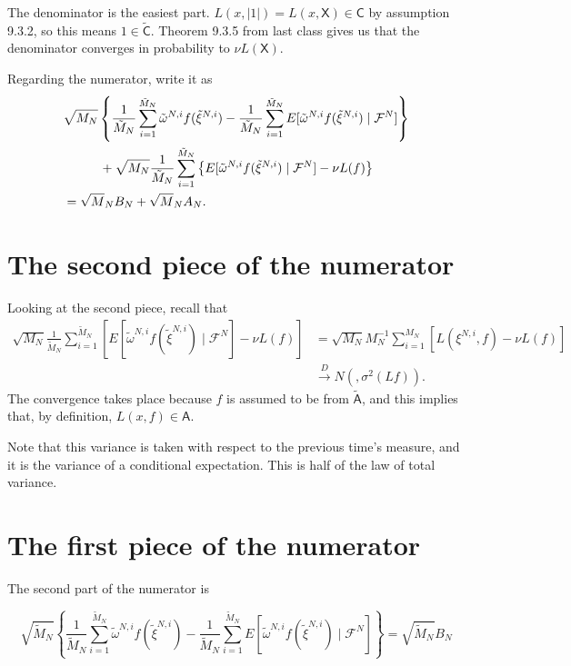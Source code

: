 \documentclass{article}
\begin{document}
The denominator is the easiest part. $L(x, |1|) = L(x,\mathsf{X}) \in \mathsf{C}$ by assumption 9.3.2, so this means $1 \in \tilde{\mathsf{C}}$. Theorem 9.3.5 from last class gives us that the denominator converges in probability to $\nu L(\mathsf{X})$.

Regarding the numerator, write it as 
\begin{align*}
&\sqrt{M_N}\left\{  \frac{1}{\tilde{M}_N} \sum_{i=1}^{\tilde{M}_N} \tilde{\omega}^{N,i} f(\tilde{\xi}^{N,i}) -  \frac{1}{\tilde{M}_N} \sum_{i=1}^{\tilde{M}_N} E[ \tilde{\omega}^{N,i} f(\tilde{\xi}^{N,i}) \mid \mathcal{F}^N] \right\} \\
& \hspace{10mm} + \sqrt{M_N} \frac{1}{\tilde{M}_N} \sum_{i=1}^{\tilde{M}_N} \left\{ E[ \tilde{\omega}^{N,i} f(\tilde{\xi}^{N,i}) \mid \mathcal{F}^N] - \nu L(f) \right\}\\
&= \sqrt{M}_N B_N + \sqrt{M}_N A_N.
\end{align*}


\section{The second piece of the numerator}

Looking at the second piece, recall that 
\begin{align*}
\sqrt{M_N} \frac{1}{\tilde{M}_N} \sum_{i=1}^{\tilde{M}_N} \left[ E[ \tilde{\omega}^{N,i} f(\tilde{\xi}^{N,i}) \mid \mathcal{F}^N] - \nu L(f) \right]
&= \sqrt{M_N}  M_N^{-1} \sum_{i=1}^{M_N}  \left[ L(\xi^{N,i},f) - \nu L(f)\right]\\ &\overset{D}{\to} N( , \sigma^2(Lf)) .
\end{align*}
The convergence takes place because $f$ is assumed to be from $\tilde{\mathsf{A}}$, and this implies that, by definition, $L(x,f) \in \mathsf{A}$. 

Note that this variance is taken with respect to the previous time's measure, and it is the variance of a conditional expectation. This is half of the law of total variance.

\section{The first piece of the numerator}

The second part of the numerator is 

$$
\sqrt{\tilde{M}_N}\left\{  \frac{1}{\tilde{M}_N} \sum_{i=1}^{\tilde{M}_N} \tilde{\omega}^{N,i} f(\tilde{\xi}^{N,i}) -  \frac{1}{\tilde{M}_N} \sum_{i=1}^{\tilde{M}_N} E[ \tilde{\omega}^{N,i} f(\tilde{\xi}^{N,i}) \mid \mathcal{F}^N] \right\} = \sqrt{\tilde{M}_N} B_N
$$
\end{document}
